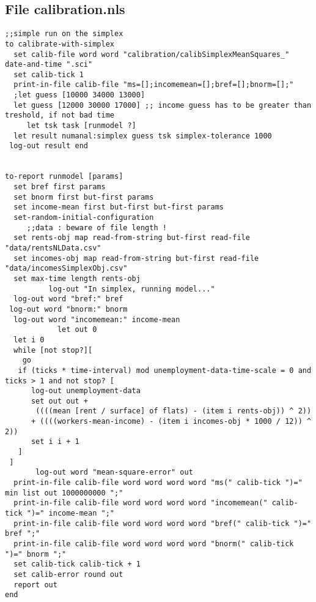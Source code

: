 \documentclass[english]{article}
\begin{document}
\subsection*{File calibration.nls}

\begin{lstlisting}[basicstyle={\scriptsize}]
;;simple run on the simplex
to calibrate-with-simplex
  set calib-file word word "calibration/calibSimplexMeanSquares_" date-and-time ".sci"
  set calib-tick 1
  print-in-file calib-file "ms=[];incomemean=[];bref=[];bnorm=[];"
  ;let guess [10000 34000 13000]
  let guess [12000 30000 17000] ;; income guess has to be greater than treshold, if not bad time
     let tsk task [runmodel ?]
  let result numanal:simplex guess tsk simplex-tolerance 1000
 log-out result end


to-report runmodel [params]
  set bref first params
  set bnorm first but-first params
  set income-mean first but-first but-first params
  set-random-initial-configuration
     ;;data : beware of file length !
  set rents-obj map read-from-string but-first read-file "data/rentsNLData.csv"
  set incomes-obj map read-from-string but-first read-file "data/incomesSimplexObj.csv"
  set max-time length rents-obj
          log-out "In simplex, running model..."
  log-out word "bref:" bref 
 log-out word "bnorm:" bnorm
  log-out word "incomemean:" income-mean
            let out 0
  let i 0
  while [not stop?][
    go 
   if (ticks * time-interval) mod unemployment-data-time-scale = 0 and ticks > 1 and not stop? [
      log-out unemployment-data
      set out out +
       ((((mean [rent / surface] of flats) - (item i rents-obj)) ^ 2))
      + ((((workers-mean-income) - (item i incomes-obj * 1000 / 12)) ^ 2))
      set i i + 1
   ]
 ]
       log-out word "mean-square-error" out
  print-in-file calib-file word word word word "ms(" calib-tick ")="  min list out 1000000000 ";"
  print-in-file calib-file word word word word "incomemean(" calib-tick ")=" income-mean ";"
  print-in-file calib-file word word word word "bref(" calib-tick ")=" bref ";"
  print-in-file calib-file word word word word "bnorm(" calib-tick ")=" bnorm ";"
  set calib-tick calib-tick + 1
  set calib-error round out
  report out
end
\end{lstlisting}
\end{document}
